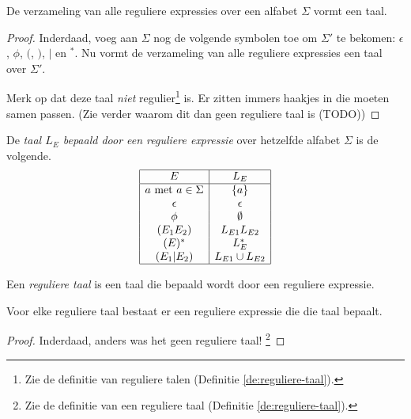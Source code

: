 \documentclass[main.tex]{subfiles}
\begin{document}
\begin{st}
  De verzameling van alle reguliere expressies over een alfabet $\Sigma$ vormt een taal.

  \begin{proof}
    Inderdaad, voeg aan $\Sigma$ nog de volgende symbolen toe om $\Sigma'$ te bekomen: $\epsilon$, $\phi$, $($, $)$, $|$ en $^{*}$.
    Nu vormt de verzameling van alle reguliere expressies een taal over $\Sigma'$.

    Merk op dat deze taal \emph{niet} regulier\footnote{Zie de definitie van reguliere talen (Definitie \ref{de:reguliere-taal}).} is. Er zitten immers haakjes in die moeten samen passen. (Zie verder waarom dit dan geen reguliere taal is (TODO)) 
  \end{proof}
\end{st}

\begin{de}
  \label{def:taal-bepaald-door-regex}
  De \emph{taal $L_E$ bepaald door een reguliere expressie} over hetzelfde alfabet $\Sigma$ is de volgende.
  \[
  \begin{array}{|c|c|}
    \hline
    E                           & L_E\\
    \hline
    a \text{ met } a \in \Sigma & \{a\}\\
    \epsilon                    & {\epsilon}\\
    \phi                        & \emptyset\\
    (E_1E_2)                    & L_{E1}L_{E2}\\
    (E)^{*}                      & L_E^*\\
    (E_1|E_2)                   & L_{E1} \cup L_{E2}\\
    \hline
  \end{array}
  \]
\end{de}

\begin{de}
  \label{de:reguliere-taal}
  Een \emph{reguliere taal} is een taal die bepaald wordt door een reguliere expressie.
\end{de}

\begin{ei}
  Voor elke reguliere taal bestaat er een reguliere expressie die die taal bepaalt.

  \begin{proof}
    Inderdaad, anders was het geen reguliere taal! \footnote{Zie de definitie van een reguliere taal (Definitie \ref{de:reguliere-taal}).}
  \end{proof}
\end{ei}
\end{document}
